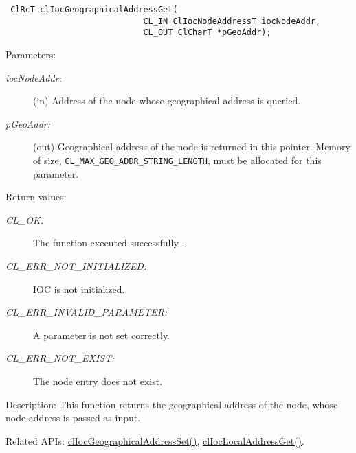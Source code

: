 \begin{flushleft}
\begin{Desc}
\footnotesize\begin{verbatim} ClRcT clIocGeographicalAddressGet( 
                  			CL_IN ClIocNodeAddressT iocNodeAddr,  
                  			CL_OUT ClCharT *pGeoAddr); 
\end{verbatim}
\normalsize
\end{Desc}
\begin{Desc}
\item[Parameters:]
\begin{description}
\item[{\em ioc\-Node\-Addr:}](in) Address of the node whose geographical address is queried. \item[{\em p\-Geo\-Addr:}](out) Geographical 
address of the node is returned in this pointer. Memory of size, {\tt{CL\_\-MAX\_\-GEO\_\-ADDR\_\-STRING\_\-LENGTH}}, must be allocated for this parameter.
\end{description}
\end{Desc}
\begin{Desc}
\item[Return values:]
\begin{description}
\item[{\em CL\_\-OK:}]The function executed successfully . \item[{\em CL\_\-ERR\_\-NOT\_\-INITIALIZED:}]IOC is not initialized.
\item[{\em CL\_\-ERR\_\-INVALID\_\-PARAMETER:}] A parameter is not set correctly. \item[{\em CL\_\-ERR\_\-NOT\_\-EXIST:}]The node entry does not exist.\end{description}
\end{Desc}
\begin{Desc}
\item[Description: ]This function returns the geographical address of the node, whose node address is passed as input.\end{Desc}
\begin{Desc}
\item[Related APIs:]\hyperlink{pageIOC126}{clIocGeographicalAddressSet()}, \hyperlink{pageioc128}{clIocLocalAddressGet()}. \end{Desc}

\newpage




\end{flushleft}
